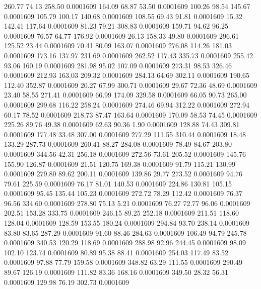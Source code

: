  260.77   74.13  258.50   0.0001609
 164.09   68.87   53.50   0.0001609
 100.26   98.54  145.67   0.0001609
 105.79  100.17  140.68   0.0001609
 108.55   69.43   91.81   0.0001609
  15.32  142.41  117.64   0.0001609
  81.23   79.21  308.83   0.0001609
 159.71   94.62   96.25   0.0001609
  76.57   64.77  176.92   0.0001609
  26.13  158.33   49.80   0.0001609
 296.61  125.52   23.44   0.0001609
  70.41   80.09  163.07   0.0001609
 276.08  114.26  181.03   0.0001609
 173.16  137.97  231.69   0.0001609
 262.52  117.43  335.73   0.0001609
 255.42   93.06  160.19   0.0001609
 281.98   95.02  107.09   0.0001609
 273.31   98.53  326.46   0.0001609
 212.93  163.03  209.32   0.0001609
 284.13   64.69  302.11   0.0001609
 190.65  112.40  352.87   0.0001609
  20.27   67.99  300.71   0.0001609
  29.67   72.36   48.69   0.0001609
  23.40   58.55  271.41   0.0001609
  66.99  174.09  329.58   0.0001609
  66.05   90.73  265.00   0.0001609
 299.68  116.22  258.24   0.0001609
 274.46   69.94  312.22   0.0001609
 272.94   60.17   78.52   0.0001609
 218.73   87.47  163.64   0.0001609
 170.09   58.53   74.45   0.0001609
 225.26   89.76   49.38   0.0001609
  62.63   90.36    1.90   0.0001609
 128.88   74.43  309.81   0.0001609
 177.48   33.48  307.00   0.0001609
 277.29  111.55  310.44   0.0001609
  18.48  133.29  287.73   0.0001609
 260.41   88.27  284.08   0.0001609
  78.49   84.67  203.80   0.0001609
 344.56   42.31  256.18   0.0001609
 272.56   73.61  205.52   0.0001609
 145.76  155.90  126.87   0.0001609
  21.51  120.75  169.38   0.0001609
  91.79  115.21  130.99   0.0001609
 279.80   89.62  200.11   0.0001609
 139.86   29.77  273.52   0.0001609
  94.76   79.61  225.59   0.0001609
  76.17   81.01  140.53   0.0001609
 224.86  130.81  105.15   0.0001609
  95.45  135.44  105.23   0.0001609
 272.72   78.29  112.42   0.0001609
  76.37   96.56  334.60   0.0001609
 278.80   75.13    5.21   0.0001609
  76.27   72.77   96.06   0.0001609
 202.51  153.28  333.75   0.0001609
 246.15   89.25  252.18   0.0001609
 211.51  118.60  128.04   0.0001609
 128.59  153.55  180.24   0.0001609
 294.84   93.70  238.14   0.0001609
  83.80   83.65  287.29   0.0001609
  91.60   88.46  284.63   0.0001609
 106.49   94.79  245.78   0.0001609
 340.53  120.29  118.69   0.0001609
 288.98   92.96  244.45   0.0001609
  98.09  102.10  123.74   0.0001609
  80.89   95.38   88.41   0.0001609
 254.03  117.49   83.52   0.0001609
  97.88   77.79  159.58   0.0001609
 348.82   63.29  111.55   0.0001609
 290.49   89.67  126.19   0.0001609
 111.82   83.36  168.16   0.0001609
 349.50   28.32   56.31   0.0001609
 129.98   76.19  302.73   0.0001609
